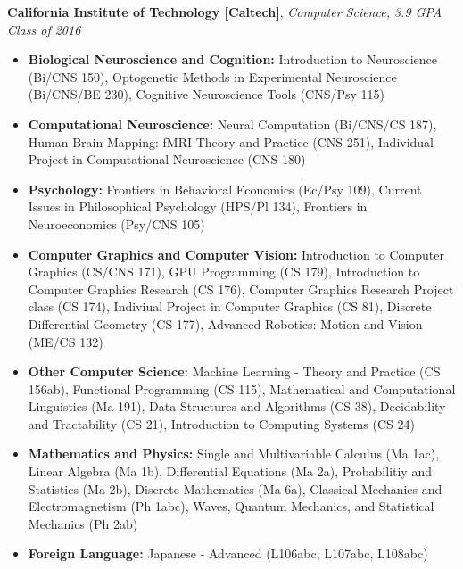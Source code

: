 \documentclass[9pt]{article}
\newenvironment{changemargin}[2]{%
  \begin{list}{}{%
    \setlength{\topsep}{0pt}%
    \setlength{\leftmargin}{#1}%
    \setlength{\rightmargin}{#2}%
    \setlength{\listparindent}{\parindent}%
    \setlength{\itemindent}{\parindent}%
    \setlength{\parsep}{\parskip}%
  }%
  \item[]}{\end{list}
}
\newenvironment{body} {
	\vspace*{-16pt}
	\begin{changemargin}{-0.25in}{-0.5in}
  }	
	{\end{changemargin}
}
\begin{document}
\begin{body}
	\vspace{18pt}
	\textbf{California Institute of Technology [Caltech]}{}, \emph{Computer Science, 3.9 GPA} \hfill \emph{Class of 2016}{} \\
	\begin{itemize} \itemsep -0pt
	\item \textbf{Biological Neuroscience and Cognition: } Introduction to Neuroscience (Bi/CNS 150), Optogenetic Methods in Experimental Neuroscience (Bi/CNS/BE 230), Cognitive Neuroscience Tools (CNS/Psy 115)
	\item \textbf{Computational Neuroscience: } Neural Computation (Bi/CNS/CS 187), Human Brain Mapping: fMRI Theory and Practice (CNS 251), Individual Project in Computational Neuroscience (CNS 180)
	\item \textbf{Psychology: } Frontiers in Behavioral Economics (Ec/Psy 109), Current Issues in Philosophical Psychology (HPS/Pl 134), Frontiers in Neuroeconomics (Psy/CNS 105)
	\item \textbf{Computer Graphics and Computer Vision: } Introduction to Computer Graphics (CS/CNS 171), GPU Programming (CS 179), Introduction to Computer Graphics Research (CS 176), Computer Graphics Research Project class (CS 174), Indiviual Project in Computer Graphics (CS 81), Discrete Differential Geometry (CS 177), Advanced Robotics: Motion and Vision (ME/CS 132)
	\item \textbf{Other Computer Science: } Machine Learning - Theory and Practice (CS 156ab), Functional Programming (CS 115), Mathematical and Computational Linguistics (Ma 191), Data Structures and Algorithms (CS 38), Decidability and Tractability (CS 21), Introduction to Computing Systems (CS 24)
	\item \textbf{Mathematics and Physics: } Single and Multivariable Calculus (Ma 1ac), Linear Algebra (Ma 1b), Differential Equations (Ma 2a), Probabilitiy and Statistics (Ma 2b), Discrete Mathematics (Ma 6a), Classical Mechanics and Electromagnetism (Ph 1abc), Waves, Quantum Mechanics, and Statistical Mechanics (Ph 2ab)
	\item \textbf{Foreign Language: } Japanese - Advanced (L106abc, L107abc, L108abc)
	\end{itemize}
\end{body}

\smallskip
\vspace*{3pt}
\end{document}

